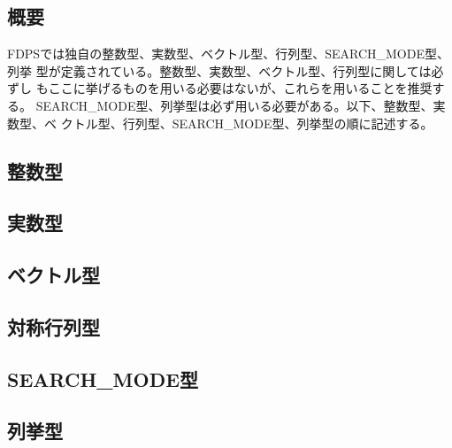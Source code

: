 \subsection{概要}

FDPSでは独自の整数型、実数型、ベクトル型、行列型、SEARCH\_MODE型、列挙
型が定義されている。整数型、実数型、ベクトル型、行列型に関しては必ずし
もここに挙げるものを用いる必要はないが、これらを用いることを推奨する。
SEARCH\_MODE型、列挙型は必ず用いる必要がある。以下、整数型、実数型、ベ
クトル型、行列型、SEARCH\_MODE型、列挙型の順に記述する。

\subsection{整数型}



\subsection{実数型}



\subsection{ベクトル型}



\subsection{対称行列型}



\subsection{SEARCH\_MODE型}



\subsection{列挙型}





